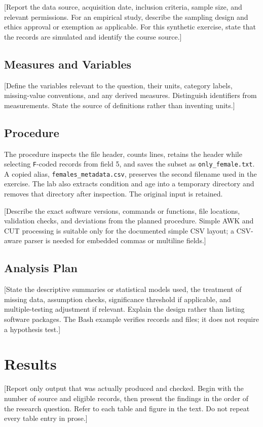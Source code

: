 \documentclass[12pt,letterpaper]{article}
\begin{document}
[Report the data source, acquisition date, inclusion criteria, sample size,
and relevant permissions. For an empirical study, describe the sampling
design and ethics approval or exemption as applicable. For this synthetic
exercise, state that the records are simulated and identify the course source.]

\subsection{Measures and Variables}
[Define the variables relevant to the question, their units, category labels,
missing-value conventions, and any derived measures. Distinguish identifiers
from measurements. State the source of definitions rather than inventing units.]

\subsection{Procedure}
The procedure inspects the file header, counts lines, retains the header while
selecting \texttt{F}-coded records from field 5, and saves the subset as
\texttt{only\_female.txt}. A copied alias,
\texttt{females\_metadata.csv}, preserves the second filename used in the
exercise. The lab also extracts condition and age into a temporary directory
and removes that directory after inspection. The original input is retained.

[Describe the exact software versions, commands or functions, file locations,
validation checks, and deviations from the planned procedure. Simple AWK and
CUT processing is suitable only for the documented simple CSV layout; a
CSV-aware parser is needed for embedded commas or multiline fields.]

\subsection{Analysis Plan}
[State the descriptive summaries or statistical models used, the treatment of
missing data, assumption checks, significance threshold if applicable, and
multiple-testing adjustment if relevant. Explain the design rather than
listing software packages. The Bash example verifies records and files; it
does not require a hypothesis test.]

\section{Results}
[Report only output that was actually produced and checked. Begin with the
number of source and eligible records, then present the findings in the order
of the research question. Refer to each table and figure in the text. Do not
repeat every table entry in prose.]
\end{document}
